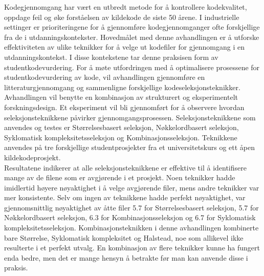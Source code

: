 Kodegjennomgang har vært en utbredt metode for å kontrollere kodekvalitet, oppdage feil og øke forståelsen av kildekode de siste 50 årene. I industrielle settinger er prioriteringene for å gjennomføre kodegjennomganger ofte forskjellige fra de i utdanningskontekster. Hovedmålet med denne avhandlingen er å utforske effektiviteten av ulike teknikker for å velge ut kodefiler for gjennomgang i en utdanningskontekst. I disse kontekstene tar denne praksisen form av studentkodevurdering. For å møte utfordringen med å optimalisere prosessene for studentkodevurdering av kode, vil avhandlingen gjennomføre en litteraturgjennomgang og sammenligne forskjellige kodeseleksjonsteknikker. Avhandlingen vil benytte en kombinasjon av strukturert og eksperimentelt forskningsdesign. Et eksperiment vil bli gjennomført for å observere hvordan seleksjonsteknikkene påvirker gjennomgangsprosessen. Seleksjonsteknikkene som anvendes og testes er Størrelsesbasert seleksjon, Nøkkelordbasert seleksjon, Syklomatisk kompleksitetsseleksjon og Kombinasjonsseleksjon. Teknikkene anvendes på tre forskjellige studentprosjekter fra et universitetskurs og ett åpen kildekodeprosjekt. \\

Resultatene indikerer at alle seleksjonsteknikkene er effektive til å identifisere mange av de filene som er avgjørende i et prosjekt. Noen teknikker hadde imidlertid høyere nøyaktighet i å velge avgjørende filer, mens andre teknikker var mer konsistente. Selv om ingen av teknikkene hadde perfekt nøyaktighet, var gjennomsnittlig nøyaktighet av åtte filer 5.7 for Størrelsesbasert seleksjon, 5.7 for Nøkkelordbasert seleksjon, 6.3 for Kombinasjonsseleksjon og 6.7 for Syklomatisk kompleksitetsseleksjon. Kombinasjonsteknikken i denne avhandlingen kombinerte bare Størrelse, Syklomatisk kompleksitet og Halstead, noe som allikevel ikke resulterte i et perfekt utvalg. En kombinasjon av flere teknikker kunne ha fungert enda bedre, men det er mange hensyn å betrakte før man kan anvende disse i praksis.